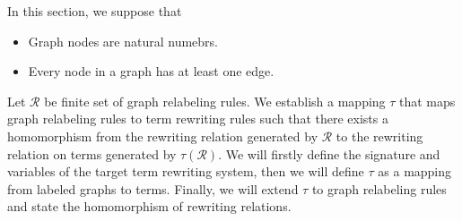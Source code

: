 In this section, we suppose that 
\begin{itemize}
    \item Graph nodes are natural numebrs.
    \item Every node in a graph has at least one edge.
\end{itemize}
Let $\mathcal{R}$ be finite set of graph relabeling rules.
We establish a mapping $\tau$ that maps graph relabeling rules to term rewriting rules such that there exists a homomorphism from the rewriting relation generated by $\mathcal{R}$ to the rewriting relation on terms generated by $\tau(\mathcal{R})$. We will firstly define the signature and variables of the target term rewriting system, then we will define $\tau$ as a mapping from labeled graphs to terms. Finally, we will extend $\tau$ to graph relabeling rules and state the homomorphism of rewriting relations.

